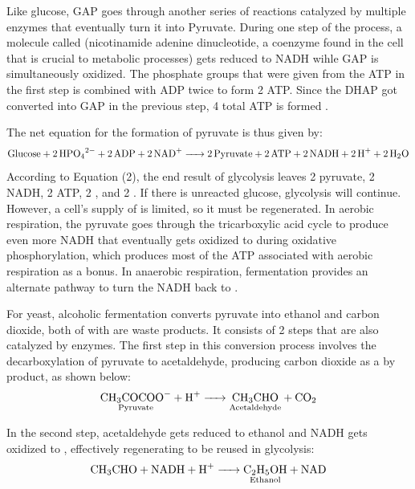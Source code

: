 \documentclass{article}
\begin{document}
\medskip

Like glucose, GAP goes through another series of reactions catalyzed by multiple enzymes that eventually turn it into Pyruvate. During one step of the process, a molecule called  (nicotinamide adenine dinucleotide, a coenzyme found in the cell that is crucial to metabolic processes) \parencite{ref} gets reduced to NADH wihle GAP is simultaneously oxidized. The phosphate groups that were given from the ATP in the first step is combined with ADP twice to form 2 ATP. Since the DHAP got converted into GAP in the previous step, 4 total ATP is formed \parencite{ref}.

\medskip

The net equation for the formation of pyruvate is thus given by:
\begin{equation}
    \ce{Glucose + 2HPO_{4}^{2-} + 2ADP + 2NAD+ -> 2Pyruvate + 2ATP + 2 NADH + 2H+ + 2H2O}
\end{equation} %
According to Equation (2), the end result of glycolysis leaves 2 pyruvate, 2 NADH, 2 ATP, 2 , and 2 . If there is unreacted glucose, glycolysis will continue. However, a cell's supply of  is limited, so it must be regenerated. In aerobic respiration, the pyruvate goes through the tricarboxylic acid cycle to produce even more NADH that eventually gets oxidized to  during oxidative phosphorylation, which produces most of the ATP associated with aerobic respiration as a bonus. In anaerobic respiration, fermentation provides an alternate pathway to turn the NADH back to .

\medskip

For yeast,  alcoholic fermentation converts pyruvate into ethanol and carbon dioxide, both of with are waste products. It consists of 2 steps that are also catalyzed by enzymes. The first step in this conversion process involves the decarboxylation of pyruvate to acetaldehyde, producing carbon dioxide as a by product, as shown below:
\begin{equation}
    \ce{\underset{\text{Pyruvate}}{\ce{CH3COCOO-}} + H+ -> \underset{\text{Acetaldehyde}}{\ce{CH3CHO}} + CO2}
\end{equation}

In the second step, acetaldehyde gets reduced to ethanol and NADH gets oxidized to , effectively regenerating  to be reused in glycolysis:
\begin{equation}
    \ce{CH3CHO + NADH + H+ -> \underset{\text{Ethanol}}{\ce{C2H5OH}} + NAD}
\end{equation}
\end{document}
